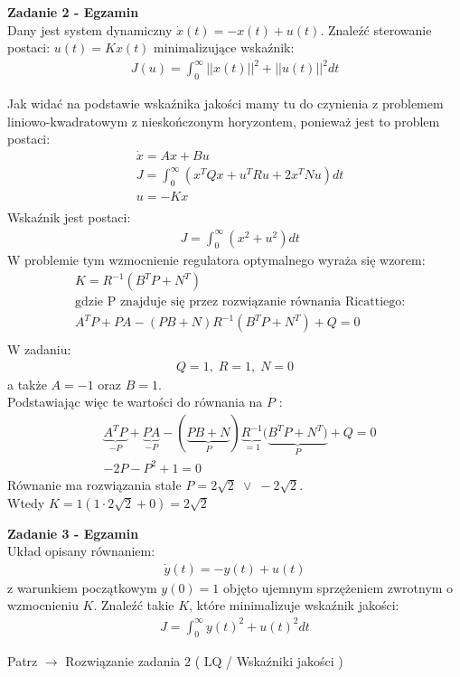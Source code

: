 \documentclass[a4paper,11pt]{article}
\begin{document}
\newpage
\begin{framed}
\textbf{Zadanie 2 - Egzamin } \\ 
Dany jest system dynamiczny \( \dot{x}(t)=-x(t)+u(t) \). Znaleźć sterowanie postaci: \( u(t)=Kx(t) \) minimalizujące wskaźnik:
\begin{align*}
J(u)= \int _0^{\infty} ||x(t)||^2+||u(t)||^2 dt
\end{align*}
\end{framed}
Jak widać na podstawie wskaźnika jakości mamy tu do czynienia z problemem liniowo-kwadratowym z nieskończonym horyzontem, ponieważ jest to problem postaci:
\begin{align*}
&\dot{x}=Ax+Bu \\
&J=\int_{0}^{\infty}(x^T Qx+u^T Ru+2x^T Nu)dt \\
&u = -Kx \\
\end{align*}
Wskaźnik jest postaci:
\begin{align*}
&J=\int_{0}^{\infty}(x^2+u^2)dt 
\end{align*}
W problemie tym wzmocnienie regulatora optymalnego wyraża się wzorem:
\begin{align*}
&K=R^{-1}(B^TP+N^T) \\
&\text{gdzie P znajduje się przez rozwiązanie równania Ricattiego:} \\
&A^TP+PA-(PB+N)R^{-1}(B^TP+N^T)+Q=0 \\
\end{align*}
W zadaniu:
\begin{align*}
Q=1, \;
R=1, \;
N=0
\end{align*}
a także \( A = -1 \) oraz \( B = 1 \). \\ 
Podstawiając więc te wartości do równania na \( P \) : 
\begin{align*}
&\underbrace{A^TP}_{-P}+\underbrace{PA}_{-P}-(\underbrace{PB+N}_{P})\underbrace{R^{-1}}_{=1}(\underbrace{B^TP+N^T)}_{P}+Q=0 \\
&-2P - P^2  + 1=0
\end{align*}
Równanie ma rozwiązania stałe \( P = 2\sqrt{2} \; \lor \; -2\sqrt{2} \). \\
Wtedy \( K = 1(1\cdot 2\sqrt{2}+0)=2\sqrt{2} \)






\newpage
\begin{framed}
\textbf{Zadanie 3 - Egzamin} \\ 
Układ opisany równaniem:
\begin{align*}
\dot{y}(t)=-y(t)+u(t)
\end{align*}
z warunkiem początkowym \( y(0)=1 \) objęto ujemnym sprzężeniem zwrotnym o wzmocnieniu \(K\). Znaleźć takie \(K\), które minimalizuje wskaźnik jakości:
\begin{align*}
J = \int _0^{\infty} y(t)^{2} + u(t)^{2} dt
\end{align*} 
\end{framed}
Patrz \( \rightarrow \) Rozwiązanie zadania 2 ( LQ / Wskaźniki jakości )
\end{document}
